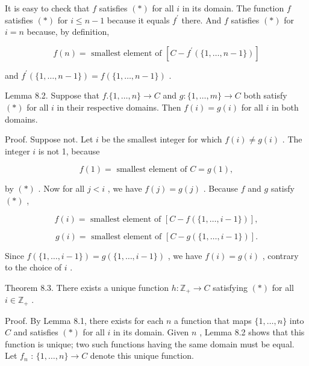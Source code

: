 \documentclass[10pt]{article}
\begin{document}
It is easy to check that \(f\) satisfies \(\left( *\right)\) for all \(i\) in its domain. The function \(f\) satisfies \(\left( *\right)\) for \(i \leq  n - 1\) because it equals \({f}^{\prime }\) there. And \(f\) satisfies \(\left( *\right)\) for \(i = n\) because, by definition,

\[
f\left( n\right)  = \text{ smallest element of }\left\lbrack  {C - {f}^{\prime }\left( {\{ 1,\ldots ,n - 1\} }\right) }\right\rbrack
\]

and \({f}^{\prime }\left( {\{ 1,\ldots ,n - 1\} }\right)  = f\left( {\{ 1,\ldots ,n - 1\} }\right)\) .

Lemma 8.2. Suppose that \(f.\{ 1,\ldots ,n\}  \rightarrow  C\) and \(g : \{ 1,\ldots ,m\}  \rightarrow  C\) both satisfy \(\left( *\right)\) for all \(i\) in their respective domains. Then \(f\left( i\right)  = g\left( i\right)\) for all \(i\) in both domains.

Proof. Suppose not. Let \(i\) be the smallest integer for which \(f\left( i\right)  \neq  g\left( i\right)\) . The integer \(i\) is not 1, because

\[
f\left( 1\right)  = \text{ smallest element of }C = g\left( 1\right) ,
\]

by \(\left( *\right)\) . Now for all \(j < i\) , we have \(f\left( j\right)  = g\left( j\right)\) . Because \(f\) and \(g\) satisfy \(\left( *\right)\) ,

\[
f\left( i\right)  = \text{ smallest element of }\left\lbrack  {C - f\left( {\{ 1,\ldots ,i - 1\} }\right) }\right\rbrack  ,
\]

\[
g\left( i\right)  = \text{ smallest element of }\left\lbrack  {C - g\left( {\{ 1,\ldots ,i - 1\} }\right) }\right\rbrack  .
\]

Since \(f\left( {\{ 1,\ldots ,i - 1\} }\right)  = g\left( {\{ 1,\ldots ,i - 1\} }\right)\) , we have \(f\left( i\right)  = g\left( i\right)\) , contrary to the choice of \(i\) .

Theorem 8.3. There exists a unique function \(h : {\mathbb{Z}}_{ + } \rightarrow  C\) satisfying \(\left( *\right)\) for all \(i \in  {\mathbb{Z}}_{ + }\) .

Proof. By Lemma 8.1, there exists for each \(n\) a function that maps \(\{ 1,\ldots ,n\}\) into \(C\) and satisfies \(\left( *\right)\) for all \(i\) in its domain. Given \(n\) , Lemma 8.2 shows that this function is unique; two such functions having the same domain must be equal. Let \({f}_{n}\) : \(\{ 1,\ldots ,n\}  \rightarrow  C\) denote this unique function.
\end{document}
